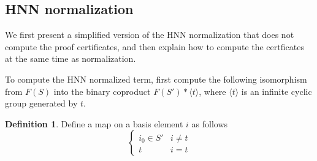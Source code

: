 \documentclass[11pt]{article} %
\theoremstyle{definition}
\theoremstyle{definition}
\theoremstyle{definition}
\theoremstyle{definition}
\theoremstyle{definition}
\newtheorem{defn}[theorem]{Definition}
\theoremstyle{definition}
\begin{document}





\subsection{HNN normalization}\label{HNNnorm}

We first present a simplified version of the HNN normalization that does not compute
the proof certificates, and then explain how to compute the certficates at the
same time as normalization.

To compute the HNN normalized term,
first compute the following isomorphism from $F(S)$ into the binary
coproduct $F(S') \ast \langle t \rangle$, where $\langle t \rangle$ is an infinite
cyclic group generated by $t$.

\begin{defn}\label{tocoprod}
  Define a map on a basis element $i$ as follows
  \begin{equation}
    \begin{cases}
      i_0 \in S' & i \ne t \\
      t & i = t
    \end{cases}
  \end{equation}
\end{defn}
\end{document}
